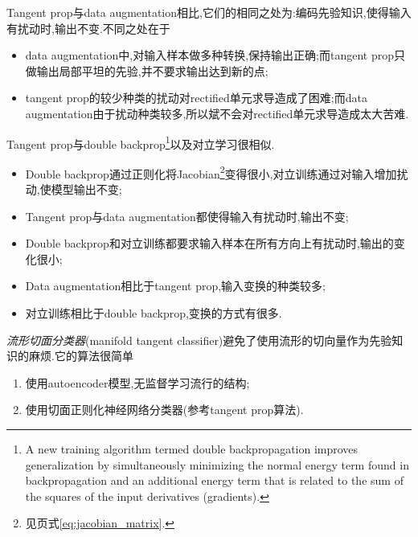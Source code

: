 Tangent prop与data augmentation相比,它们的相同之处为:编码先验知识,使得输入有扰动时,输出不变.不同之处在于
\begin{itemize}
    \item data augmentation中,对输入样本做多种转换,保持输出正确;而tangent prop只做输出局部平坦的先验,并不要求输出达到新的点;
    \item tangent prop的较少种类的扰动对rectified单元求导造成了困难;而data augmentation由于扰动种类较多,所以斌不会对rectified单元求导造成太大苦难.
\end{itemize}

Tangent prop与double backprop\footnote{A new training algorithm termed double backpropagation improves generalization by simultaneously minimizing the normal energy term found in backpropagation and an additional energy term that is related to the sum of the squares of the input derivatives (gradients).}以及对立学习很相似.
\begin{itemize}
    \item Double backprop通过正则化将Jacobian\footnote{见\pageref{eq:jacobian_matrix}页式\ref{eq:jacobian_matrix}.}变得很小,对立训练通过对输入增加扰动,使模型输出不变;
    \item Tangent prop与data augmentation都使得输入有扰动时,输出不变;
    \item Double backprop和对立训练都要求输入样本在所有方向上有扰动时,输出的变化很小;
    \item Data augmentation相比于tangent prop,输入变换的种类较多;
    \item 对立训练相比于double backprop,变换的方式有很多.
\end{itemize}

\textit{流形切面分类器}(manifold tangent classifier)避免了使用流形的切向量作为先验知识的麻烦.它的算法很简单
\begin{enumerate}
    \item 使用autoencoder模型,无监督学习流行的结构;
    \item 使用切面正则化神经网络分类器(参考tangent prop算法).
\end{enumerate}